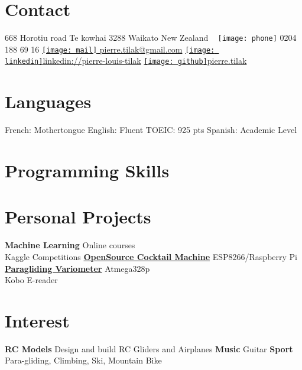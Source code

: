\documentclass[a4paper]{friggeri-cv} %
\begin{document}


\begin{aside} %
\section{Contact}
668 Horotiu road
Te kowhai
3288 Waikato
New Zealand
~
\texttt{[image: phone]} 0204 188 69 16
\href{mailto:pierre.tilak@gmail.com}{\texttt{[image: mail]} pierre.tilak@gmail.com}
\href{https://www.linkedin.com/pub/pierre-louis-tilak/96/162/a83}{\texttt{[image: linkedin]}linkedin://pierre-louis-tilak}
\href{http://tilaktilak.github.io}{\texttt{[image: github]}pierre.tilak}
\section{Languages}
French: Mothertongue
English: Fluent
TOEIC: 925 pts 
Spanish: Academic Level\bigskip\bigskip
\section{Programming Skills}
\bigskip\bigskip
\section{Personal Projects}
\textbf{Machine Learning}
Online courses\\Kaggle Competitions
\href{https://github.com/tilaktilak/Inebriator}{\textbf{OpenSource Cocktail Machine}}
ESP8266/Raspberry Pi\bigskip
\href{https://github.com/tilaktilak/xcvario}{\textbf{Paragliding Variometer}}
Atmega328p\\ Kobo E-reader\bigskip\bigskip
\section{Interest}
\textbf{RC Models} Design and build RC Gliders and Airplanes
\textbf{Music} Guitar
\textbf{Sport} Para-gliding, Climbing, Ski, Mountain Bike
\end{aside}
\end{document}
